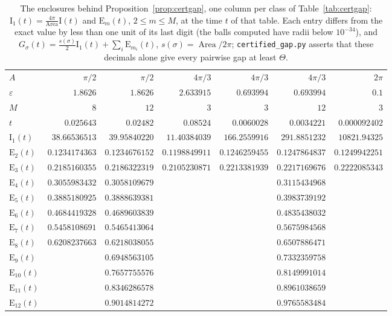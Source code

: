 \documentclass[pdflatex,sn-mathphys-num]{sn-jnl}
\theoremstyle{thmstyleone}%
\theoremstyle{thmstylethree}%
\newcommand{\Area}{\operatorname{Area}}
\begin{document}
\begin{appendices}
\begin{table}[h]
\centering\scriptsize
\caption{The enclosures behind Proposition~\ref{prop:certgap}, one column per class of Table~\ref{tab:certgap}: $\mathrm I_1(t)=\frac{4\pi}{\Area}\mathrm I(t)$ and $\mathrm E_m(t)$, $2\le m\le M$, at the time $t$ of that table. Each entry differs from the exact value by less than one unit of its last digit (the balls computed have radii below $10^{-34}$), and $G_\sigma(t)=\frac{s(\sigma)}2\mathrm I_1(t)+\sum_i\mathrm E_{m_i}(t)$, $s(\sigma)=\Area/2\pi$; \texttt{certified\_gap.py} asserts that these decimals alone give every pairwise gap at least $\Theta$.}\label{tab:certencl}
\setlength{\tabcolsep}{2pt}\begin{tabular}{@{}lrrrrrr@{}}
\toprule
$A$ & $\pi/2$ & $\pi/2$ & $4\pi/3$ & $4\pi/3$ & $4\pi/3$ & $2\pi$\\
$\varepsilon$ & $1.8626$ & $1.8626$ & $2.633915$ & $0.693994$ & $0.693994$ & $0.1$\\
$M$ & $8$ & $12$ & $3$ & $3$ & $12$ & $3$\\
$t$ & $0.025643$ & $0.02482$ & $0.08524$ & $0.0060028$ & $0.0034221$ & $0.000092402$\\
\midrule
$\mathrm I_1(t)$ & $38.66536513$ & $39.95840220$ & $11.40384039$ & $166.2559916$ & $291.8851232$ & $10821.94325$\\
$\mathrm E_{2}(t)$ & $0.1234174363$ & $0.1234676152$ & $0.1198849911$ & $0.1246259455$ & $0.1247864837$ & $0.1249942251$\\
$\mathrm E_{3}(t)$ & $0.2185160355$ & $0.2186322319$ & $0.2105230871$ & $0.2213381939$ & $0.2217169676$ & $0.2222085343$\\
$\mathrm E_{4}(t)$ & $0.3055983432$ & $0.3058109679$ &  &  & $0.3115434968$ & \\
$\mathrm E_{5}(t)$ & $0.3885180925$ & $0.3888639381$ &  &  & $0.3983739192$ & \\
$\mathrm E_{6}(t)$ & $0.4684419328$ & $0.4689603839$ &  &  & $0.4835438032$ & \\
$\mathrm E_{7}(t)$ & $0.5458108691$ & $0.5465413064$ &  &  & $0.5675984568$ & \\
$\mathrm E_{8}(t)$ & $0.6208237663$ & $0.6218038055$ &  &  & $0.6507886471$ & \\
$\mathrm E_{9}(t)$ &  & $0.6948563105$ &  &  & $0.7332359758$ & \\
$\mathrm E_{10}(t)$ &  & $0.7657755576$ &  &  & $0.8149991014$ & \\
$\mathrm E_{11}(t)$ &  & $0.8346286578$ &  &  & $0.8961038659$ & \\
$\mathrm E_{12}(t)$ &  & $0.9014814272$ &  &  & $0.9765583484$ & \\
\bottomrule
\end{tabular}
\end{table}

\end{appendices}

\clearpage

\end{document}

